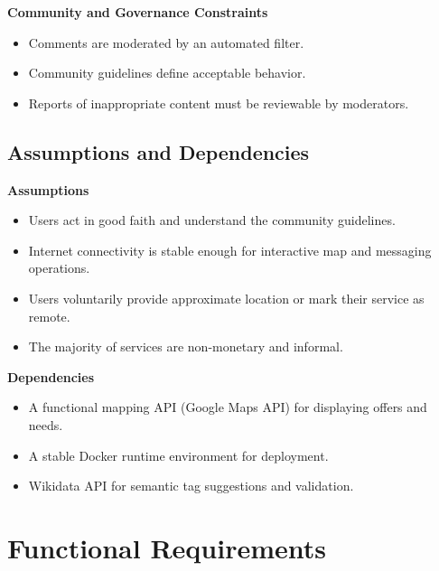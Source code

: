 \documentclass[11pt,a4paper]{report}
\begin{document}
\textbf{Community and Governance Constraints}
\begin{itemize}
    \item Comments are moderated by an automated filter.
    \item Community guidelines define acceptable behavior.
    \item Reports of inappropriate content must be reviewable by moderators.
\end{itemize}

\subsection{Assumptions and Dependencies}

\textbf{Assumptions}
\begin{itemize}
    \item Users act in good faith and understand the community guidelines.
    \item Internet connectivity is stable enough for interactive map and messaging operations.
    \item Users voluntarily provide approximate location or mark their service as remote.
    \item The majority of services are non-monetary and informal.
\end{itemize}

\textbf{Dependencies}
\begin{itemize}
    \item A functional mapping API (Google Maps API) for displaying offers and needs.
    \item A stable Docker runtime environment for deployment.
    \item Wikidata API for semantic tag suggestions and validation.
\end{itemize}

\section{Functional Requirements}
\label{sec:functional-requirements}
\end{document}

